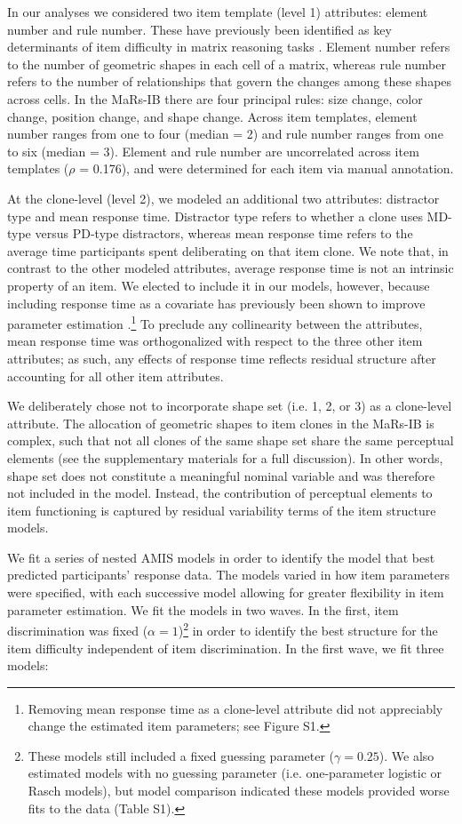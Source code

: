 \documentclass[a4paper,man,natbib]{apa6}
\begin{document}
In our analyses we considered two item template (level 1) attributes: element number and rule number. These have previously been identified as key determinants of item difficulty in matrix reasoning tasks \citep{embretson1998cognitive, primi2001complexity}. Element number refers to the number of geometric shapes in each cell of a matrix, whereas rule number refers to the number of relationships that govern the changes among these shapes across cells. In the MaRs-IB there are four principal rules: size change, color change, position change, and shape change. Across item templates, element number ranges from one to four (median = 2) and rule number ranges from one to six (median = 3). Element and rule number are uncorrelated across item templates ($\rho$ = 0.176), and were determined for each item via manual annotation.  

At the clone-level (level 2), we modeled an additional two attributes: distractor type and mean response time. Distractor type refers to whether a clone uses MD-type versus PD-type distractors, whereas mean response time refers to the average time participants spent deliberating on that item clone. We note that, in contrast to the other modeled attributes, average response time is not an intrinsic property of an item. We elected to include it in our models, however, because including response time as a covariate has previously been shown to improve parameter estimation \citep{bertling2018using}.\footnote{Removing mean response time as a clone-level attribute did not appreciably change the estimated item parameters; see Figure S1.} To preclude any collinearity between the attributes, mean response time was orthogonalized with respect to the three other item attributes; as such, any effects of response time reflects residual structure after accounting for all other item attributes.

We deliberately chose not to incorporate shape set (i.e. 1, 2, or 3) as a clone-level attribute. The allocation of geometric shapes to item clones in the MaRs-IB is complex, such that not all clones of the same shape set share the same perceptual elements (see the supplementary materials for a full discussion). In other words, shape set does not constitute a meaningful nominal variable and was therefore not included in the model. Instead, the contribution of perceptual elements to item functioning is captured by residual variability terms of the item structure models.

We fit a series of nested AMIS models in order to identify the model that best predicted participants' response data. The models varied in how item parameters were specified, with each successive model allowing for greater flexibility in item parameter estimation. We fit the models in two waves. In the first, item discrimination was fixed ($\alpha = 1$)\footnote{These models still included a fixed guessing parameter ($\gamma = 0.25$). We also estimated models with no guessing parameter (i.e. one-parameter logistic or Rasch models), but model comparison indicated these models provided worse fits to the data (Table S1).} in order to identify the best structure for the item difficulty independent of item discrimination. In the first wave, we fit three models:
\end{document}
